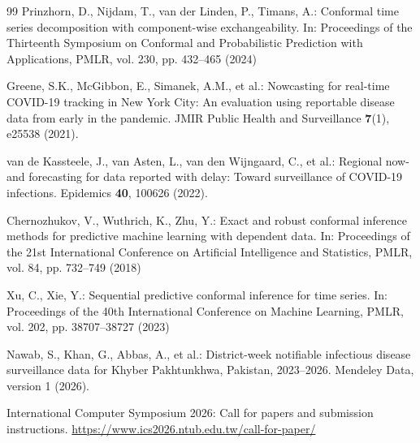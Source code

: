 \documentclass[runningheads]{llncs}
\begin{document}
\begin{thebibliography}{99}
Prinzhorn, D., Nijdam, T., van der Linden, P., Timans, A.: Conformal time series decomposition with component-wise exchangeability. In: Proceedings of the Thirteenth Symposium on Conformal and Probabilistic Prediction with Applications, PMLR, vol. 230, pp. 432--465 (2024)

Greene, S.K., McGibbon, E., Simanek, A.M., et al.: Nowcasting for real-time COVID-19 tracking in New York City: An evaluation using reportable disease data from early in the pandemic. JMIR Public Health and Surveillance \textbf{7}(1), e25538 (2021). 

van de Kassteele, J., van Asten, L., van den Wijngaard, C., et al.: Regional now- and forecasting for data reported with delay: Toward surveillance of COVID-19 infections. Epidemics \textbf{40}, 100626 (2022). 

Chernozhukov, V., Wuthrich, K., Zhu, Y.: Exact and robust conformal inference methods for predictive machine learning with dependent data. In: Proceedings of the 21st International Conference on Artificial Intelligence and Statistics, PMLR, vol. 84, pp. 732--749 (2018)

Xu, C., Xie, Y.: Sequential predictive conformal inference for time series. In: Proceedings of the 40th International Conference on Machine Learning, PMLR, vol. 202, pp. 38707--38727 (2023)

Nawab, S., Khan, G., Abbas, A., et al.: District-week notifiable infectious disease surveillance data for Khyber Pakhtunkhwa, Pakistan, 2023--2026. Mendeley Data, version 1 (2026). 

International Computer Symposium 2026: Call for papers and submission instructions. \url{https://www.ics2026.ntub.edu.tw/call-for-paper/}
\end{thebibliography}
\endgroup
\end{document}

